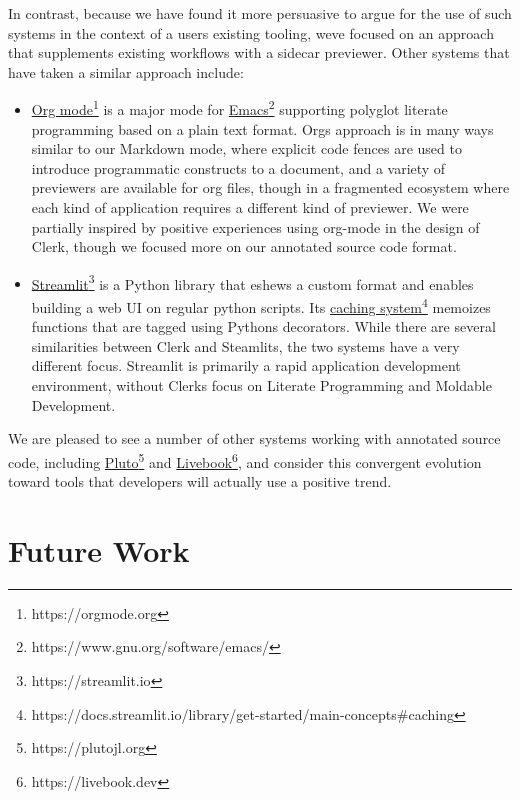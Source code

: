 \documentclass[sigconf,screen]{acmart}
\begin{document}
In contrast, because we have found it more persuasive to argue for the use of such systems in the context of a user\textquotesingle s existing tooling, we\textquotesingle ve focused on an approach that supplements existing workflows with a sidecar previewer. Other systems that have taken a similar approach include:

\begin{itemize}
\item
  {\href{https://orgmode.org}{Org mode}\footnote{https://orgmode.org}} is a major mode for {\href{https://www.gnu.org/software/emacs/}{Emacs}\footnote{https://www.gnu.org/software/emacs/}} supporting polyglot literate programming based on a plain text format. Org\textquotesingle s approach is in many ways similar to our Markdown mode, where explicit code fences are used to introduce programmatic constructs to a document, and a variety of previewers are available for org files, though in a fragmented ecosystem where each kind of application requires a different kind of previewer. We were partially inspired by positive experiences using org-mode in the design of Clerk, though we focused more on our annotated source code format.
\item
  {\href{https://streamlit.io}{Streamlit}\footnote{https://streamlit.io}} is a Python library that eshews a custom format and enables building a web UI on regular python scripts. Its {\href{https://docs.streamlit.io/library/get-started/main-concepts\#caching}{caching system}\footnote{https://docs.streamlit.io/library/get-started/main-concepts\#caching}} memoizes functions that are tagged using Python\textquotesingle s decorators. While there are several similarities between Clerk and Steamlits, the two systems have a very different focus. Streamlit is primarily a rapid application development environment, without Clerk\textquotesingle s focus on Literate Programming and Moldable Development.
\end{itemize}

We are pleased to see a number of other systems working with annotated source code, including {\href{https://plutojl.org}{Pluto}\footnote{https://plutojl.org}} and {\href{https://livebook.dev}{Livebook}\footnote{https://livebook.dev}}, and consider this convergent evolution toward tools that developers will actually use a positive trend.

\hypertarget{future-work}{%
\section{Future Work}\label{future-work}}
\end{document}
